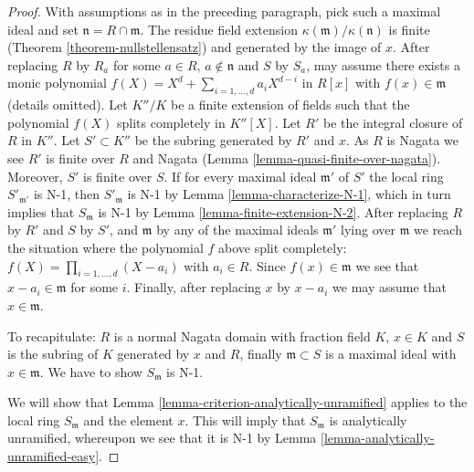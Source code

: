 \begin{proof}
\medskip\noindent
With assumptions as in the preceding paragraph, pick such a maximal
ideal and set $\mathfrak n = R \cap \mathfrak m$. The residue field
extension $\kappa(\mathfrak m)/\kappa(\mathfrak n)$ is finite
(Theorem \ref{theorem-nullstellensatz}) and generated by the image of $x$.
After replacing $R$ by $R_a$ for some $a \in R$, $a \not \in \mathfrak n$
and $S$ by $S_a$, may assume there exists a monic polynomial
$f(X) = X^d + \sum_{i = 1, \ldots, d} a_iX^{d - i}$ in $R[x]$ with
$f(x) \in \mathfrak m$ (details omitted).
Let $K''/K$ be a finite extension of fields such that the polynomial
$f(X)$ splits completely in $K''[X]$.
Let $R'$ be the integral closure of $R$ in $K''$.
Let $S' \subset K''$ be the subring generated by $R'$ and $x$.
As $R$ is Nagata we see $R'$ is finite over $R$ and Nagata
(Lemma \ref{lemma-quasi-finite-over-nagata}).
Moreover, $S'$ is finite over $S$. If for every maximal ideal
$\mathfrak m'$ of $S'$ the local ring $S'_{\mathfrak m'}$ is
N-1, then $S'_{\mathfrak m}$ is N-1 by
Lemma \ref{lemma-characterize-N-1}, which in turn
implies that $S_{\mathfrak m}$ is N-1 by
Lemma \ref{lemma-finite-extension-N-2}.
After replacing $R$ by $R'$ and $S$ by $S'$, and $\mathfrak m$ by
any of the maximal ideals $\mathfrak m'$ lying over $\mathfrak m$
we reach the situation where the polynomial $f$ above split completely:
$f(X) = \prod_{i = 1, \ldots, d} (X - a_i)$ with $a_i \in R$.
Since $f(x) \in \mathfrak m$ we see that $x - a_i \in \mathfrak m$
for some $i$. Finally, after replacing $x$ by $x - a_i$ we may assume
that $x \in \mathfrak m$.

\medskip\noindent
To recapitulate: $R$ is a normal Nagata domain with fraction field $K$,
$x \in K$ and $S$ is the subring of $K$ generated by $x$ and $R$,
finally $\mathfrak m \subset S$ is a maximal ideal with $x \in \mathfrak m$.
We have to show $S_{\mathfrak m}$ is N-1.

\medskip\noindent
We will show that Lemma \ref{lemma-criterion-analytically-unramified}
applies to the local ring
$S_{\mathfrak m}$ and the element $x$. This will imply that
$S_{\mathfrak m}$ is analytically unramified, whereupon we
see that it is N-1 by Lemma \ref{lemma-analytically-unramified-easy}.


\end{proof}
